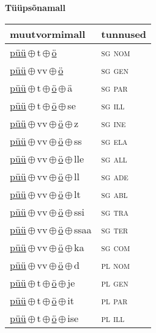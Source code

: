 

\vspace{3.5em}
\noindent \begin{minipage}{\textwidth}
\noindent \textbf{Tüüpsõnamall \,}\\

\begin{sideways}
\begin{tabular}{l l}
muutvormimall & tunnused \\
\hline
\underline{püü}\,$\oplus$\,t\,$\oplus$\,\underline{ö} & \textsc{ sg nom } \\
\underline{püü}\,$\oplus$\,vv\,$\oplus$\,\underline{ö} & \textsc{ sg gen } \\
\underline{püü}\,$\oplus$\,t\,$\oplus$\,\underline{ö}\,$\oplus$\,ä & \textsc{ sg par } \\
\underline{püü}\,$\oplus$\,t\,$\oplus$\,\underline{ö}\,$\oplus$\,se & \textsc{ sg ill } \\
\underline{püü}\,$\oplus$\,vv\,$\oplus$\,\underline{ö}\,$\oplus$\,z & \textsc{ sg ine } \\
\underline{püü}\,$\oplus$\,vv\,$\oplus$\,\underline{ö}\,$\oplus$\,ss & \textsc{ sg ela } \\
\underline{püü}\,$\oplus$\,vv\,$\oplus$\,\underline{ö}\,$\oplus$\,lle & \textsc{ sg all } \\
\underline{püü}\,$\oplus$\,vv\,$\oplus$\,\underline{ö}\,$\oplus$\,ll & \textsc{ sg ade } \\
\underline{püü}\,$\oplus$\,vv\,$\oplus$\,\underline{ö}\,$\oplus$\,lt & \textsc{ sg abl } \\
\underline{püü}\,$\oplus$\,vv\,$\oplus$\,\underline{ö}\,$\oplus$\,ssi & \textsc{ sg tra } \\
\underline{püü}\,$\oplus$\,vv\,$\oplus$\,\underline{ö}\,$\oplus$\,ssaa & \textsc{ sg ter } \\
\underline{püü}\,$\oplus$\,vv\,$\oplus$\,\underline{ö}\,$\oplus$\,ka & \textsc{ sg com } \\
\underline{püü}\,$\oplus$\,vv\,$\oplus$\,\underline{ö}\,$\oplus$\,d & \textsc{ pl nom } \\
\underline{püü}\,$\oplus$\,t\,$\oplus$\,\underline{ö}\,$\oplus$\,je & \textsc{ pl gen } \\
\underline{püü}\,$\oplus$\,t\,$\oplus$\,\underline{ö}\,$\oplus$\,it & \textsc{ pl par } \\
\underline{püü}\,$\oplus$\,t\,$\oplus$\,\underline{ö}\,$\oplus$\,ise & \textsc{ pl ill } \\

\end{tabular}
\end{sideways}
\end{minipage}

